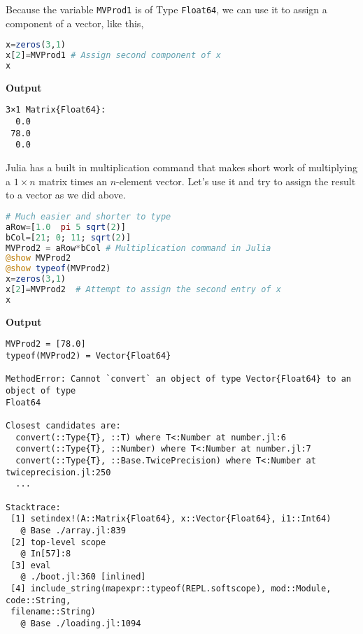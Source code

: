 Because the variable \texttt{MVProd1} is of Type \texttt{Float64}, we can use it to assign a component of a vector, like this,
\begin{lstlisting}[language=Julia,style=mystyle]
x=zeros(3,1)
x[2]=MVProd1 # Assign second component of x
x
\end{lstlisting}
\textbf{Output} 
\begin{verbatim}
3×1 Matrix{Float64}:
  0.0
 78.0
  0.0
\end{verbatim}

Julia has a built in multiplication command that makes short work of multiplying a $1 \times n$ matrix times an $n$-element vector. Let's use it and try to assign the result to a vector as we did above. 
\begin{lstlisting}[language=Julia,style=mystyle]
# Much easier and shorter to type
aRow=[1.0  pi 5 sqrt(2)]
bCol=[21; 0; 11; sqrt(2)]
MVProd2 = aRow*bCol # Multiplication command in Julia
@show MVProd2
@show typeof(MVProd2)
x=zeros(3,1)
x[2]=MVProd2  # Attempt to assign the second entry of x
x
\end{lstlisting}
\textbf{Output} 
\begin{verbatim}
MVProd2 = [78.0]
typeof(MVProd2) = Vector{Float64}

MethodError: Cannot `convert` an object of type Vector{Float64} to an object of type
Float64

Closest candidates are:
  convert(::Type{T}, ::T) where T<:Number at number.jl:6
  convert(::Type{T}, ::Number) where T<:Number at number.jl:7
  convert(::Type{T}, ::Base.TwicePrecision) where T<:Number at twiceprecision.jl:250
  ...

Stacktrace:
 [1] setindex!(A::Matrix{Float64}, x::Vector{Float64}, i1::Int64)
   @ Base ./array.jl:839
 [2] top-level scope
   @ In[57]:8
 [3] eval
   @ ./boot.jl:360 [inlined]
 [4] include_string(mapexpr::typeof(REPL.softscope), mod::Module, code::String,
 filename::String)
   @ Base ./loading.jl:1094
\end{verbatim}

